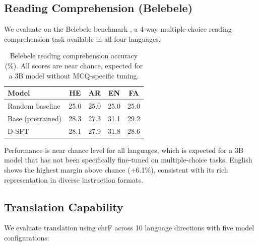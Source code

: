 \documentclass[10pt,twocolumn]{article}
\begin{document}
\subsection{Reading Comprehension (Belebele)}

We evaluate on the Belebele benchmark \citep{bandarkar2023belebele}, a 4-way multiple-choice reading comprehension task available in all four languages.

\begin{table}[H]
\centering\small
\begin{tabular}{lcccc}
\toprule
\textbf{Model} & \textbf{HE} & \textbf{AR} & \textbf{EN} & \textbf{FA} \\
\midrule
Random baseline & 25.0 & 25.0 & 25.0 & 25.0 \\
Base (pretrained) & 28.3 & 27.3 & 31.1 & 29.2 \\
D-SFT & 28.1 & 27.9 & 31.8 & 28.6 \\
\bottomrule
\end{tabular}
\caption{Belebele reading comprehension accuracy (\%). All scores are near chance, expected for a 3B model without MCQ-specific tuning.}
\label{tab:belebele}
\end{table}

Performance is near chance level for all languages, which is expected for a 3B model that has not been specifically fine-tuned on multiple-choice tasks. English shows the highest margin above chance (+6.1\%), consistent with its rich representation in diverse instruction formats.

\subsection{Translation Capability}

We evaluate translation using chrF \citep{popovic2015chrf} across 10 language directions with five model configurations:
\end{document}
